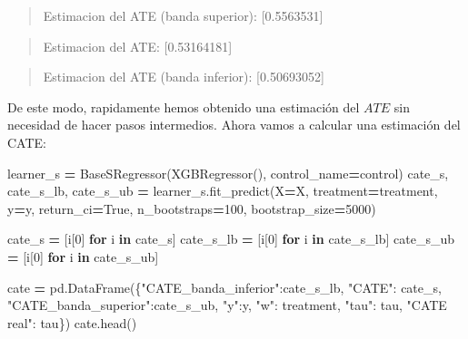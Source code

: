 \documentclass[
  a4paper,
  DIV=11,
  numbers=noendperiod]{scrreprt}
\newenvironment{Shaded}{\begin{snugshade}}{\end{snugshade}}
\newcommand{\ControlFlowTok}[1]{\textcolor[rgb]{0.13,0.29,0.53}{\textbf{#1}}}
\newcommand{\DecValTok}[1]{\textcolor[rgb]{0.00,0.00,0.81}{#1}}
\newcommand{\KeywordTok}[1]{\textcolor[rgb]{0.13,0.29,0.53}{\textbf{#1}}}
\newcommand{\NormalTok}[1]{#1}
\newcommand{\OperatorTok}[1]{\textcolor[rgb]{0.81,0.36,0.00}{\textbf{#1}}}
\newcommand{\StringTok}[1]{\textcolor[rgb]{0.31,0.60,0.02}{#1}}
\newcommand{\VariableTok}[1]{\textcolor[rgb]{0.00,0.00,0.00}{#1}}
\begin{document}
\begin{quote}
Estimacion del ATE (banda superior): {[}0.5563531{]}
\end{quote}

\begin{quote}
Estimacion del ATE: {[}0.53164181{]}
\end{quote}

\begin{quote}
Estimacion del ATE (banda inferior): {[}0.50693052{]}
\end{quote}

De este modo, rapidamente hemos obtenido una estimación del \(ATE\) sin
necesidad de hacer pasos intermedios. Ahora vamos a calcular una
estimación del CATE:

\begin{Shaded}
\begin{Highlighting}[numbers=left,,]

\NormalTok{learner\_s }\OperatorTok{=}\NormalTok{ BaseSRegressor(XGBRegressor(), control\_name}\OperatorTok{=}\StringTok{\textquotesingle{}control\textquotesingle{}}\NormalTok{)}
\NormalTok{cate\_s, cate\_s\_lb, cate\_s\_ub }\OperatorTok{=}\NormalTok{ learner\_s.fit\_predict(X}\OperatorTok{=}\NormalTok{X, treatment}\OperatorTok{=}\NormalTok{treatment, y}\OperatorTok{=}\NormalTok{y, return\_ci}\OperatorTok{=}\VariableTok{True}\NormalTok{,}
\NormalTok{                               n\_bootstraps}\OperatorTok{=}\DecValTok{100}\NormalTok{, bootstrap\_size}\OperatorTok{=}\DecValTok{5000}\NormalTok{)}

\NormalTok{cate\_s }\OperatorTok{=}\NormalTok{ [i[}\DecValTok{0}\NormalTok{] }\ControlFlowTok{for}\NormalTok{ i }\KeywordTok{in}\NormalTok{ cate\_s]}
\NormalTok{cate\_s\_lb }\OperatorTok{=}\NormalTok{ [i[}\DecValTok{0}\NormalTok{] }\ControlFlowTok{for}\NormalTok{ i }\KeywordTok{in}\NormalTok{ cate\_s\_lb]}
\NormalTok{cate\_s\_ub }\OperatorTok{=}\NormalTok{ [i[}\DecValTok{0}\NormalTok{] }\ControlFlowTok{for}\NormalTok{ i }\KeywordTok{in}\NormalTok{ cate\_s\_ub]}

\NormalTok{cate }\OperatorTok{=}\NormalTok{ pd.DataFrame(\{}\StringTok{"CATE\_banda\_inferior"}\NormalTok{:cate\_s\_lb, }\StringTok{"CATE"}\NormalTok{: cate\_s, }\StringTok{"CATE\_banda\_superior"}\NormalTok{:cate\_s\_ub, }\StringTok{"y"}\NormalTok{:y, }\StringTok{"w"}\NormalTok{: treatment, }\StringTok{"tau"}\NormalTok{: tau, }\StringTok{"CATE real"}\NormalTok{: tau\})}
\NormalTok{cate.head()}
\end{Highlighting}
\end{Shaded}
\end{document}
